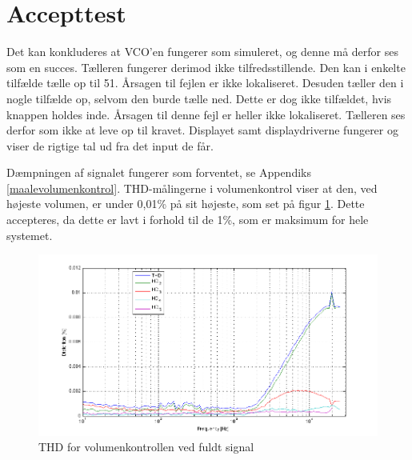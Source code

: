 \section{Accepttest}
\label{volumenkontrol-accepttest}
Det kan konkluderes at VCO'en fungerer som simuleret, og denne må derfor ses som en succes. Tælleren fungerer derimod ikke tilfredsstillende. Den kan i enkelte tilfælde tælle op til 51. Årsagen til fejlen er ikke lokaliseret. Desuden tæller den i nogle tilfælde op, selvom den burde tælle ned. Dette er dog ikke tilfældet, hvis knappen holdes inde. Årsagen til denne fejl er heller ikke lokaliseret. Tælleren ses derfor som ikke at leve op til kravet. Displayet samt displaydriverne fungerer og viser de rigtige tal ud fra det input de får.

Dæmpningen af signalet fungerer som forventet, se Appendiks \ref{maalevolumenkontrol}. THD-målingerne i volumenkontrol viser at den, ved højeste volumen, er under 0,01\% på sit højeste, som set på figur \ref{fig:accvold:thd0}. Dette accepteres, da dette er lavt i forhold til de 1\%, som er maksimum for hele systemet. 
\begin{figure}[h]
\centering
\includegraphics[width=\textwidth]{maalerapporter/volumenkontrol/2Vniveau0-thd.png}
\caption{THD for volumenkontrollen ved fuldt signal}
\label{fig:accvold:thd0}
\end{figure}

